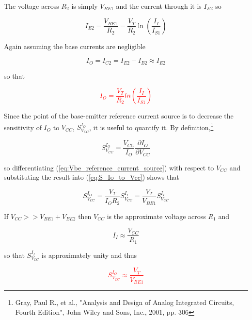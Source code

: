 \noindent The voltage across $R_{2}$ is simply $V_{BE1}$ and the current through it is $I_{E2}$ so

\begin{equation}
I_{E2} = \frac{V_{BE1}}{R_{2}} = \frac{V_{T}}{R_{2}}\ln\left(\frac{I_{I}}{I_{S1}}\right)
\end{equation}

\noindent Again assuming the base currents are negligible

\begin{equation}
I_{O} = I_{C2} = I_{E2} - I_{B2} \approx I_{E2}
\end{equation}

\noindent so that

\textcolor{red}{
\begin{equation}
I_{O} = \frac{V_{T}}{R_{2}}ln(\frac{I_{I}}{I_{S1}})
\label{eq:Vbe_reference_current_source}
\end{equation}
}

Since the point of the base-emitter reference current source is to decrease the sensitivity of $I_{O}$ to $V_{CC}$, $S_{{V}_{CC}}^{{I}_{O}}$, it is useful to quantify it. By definition,\footnote{Gray, Paul R., et al., "Analysis and Design of Analog Integrated Circuits, Fourth Edition", John Wiley and Sons, Inc., 2001, pp. 306}

\begin{equation}
S_{{V}_{CC}}^{{I}_{O}} = \frac{V_{CC}}{I_{O}}\frac{\partial I_{O}}{\partial V_{CC}}
\label{eq:S_Io_to_Vcc}
\end{equation}

\noindent so differentiating (\ref{eq:Vbe_reference_current_source}) with respect to $V_{CC}$ and substituting the result into (\ref{eq:S_Io_to_Vcc}) shows that

\begin{equation}
S_{{V}_{CC}}^{{I}_{O}} = \frac{V_{T}}{I_{O}R_{2}}S_{{V}_{CC}}^{{I}_{I}} = \frac{V_{T}}{V_{BE1}}S_{{V}_{CC}}^{{I}_{I}}
\end{equation}

\noindent If $V_{CC} >> V_{BE1} + V_{BE2}$ then $V_{CC}$ is the approximate voltage across $R_{1}$ and

\begin{equation}
I_{I} \approx \frac{V_{CC}}{R_{1}}
\end{equation}

\noindent so that $S_{{V}_{CC}}^{{I}_{I}}$ is approximately unity and thus

\textcolor{red}{
\begin{equation}
S_{{V}_{CC}}^{{I}_{O}} \approx \frac{V_{T}}{V_{BE1}}
\end{equation}
}

